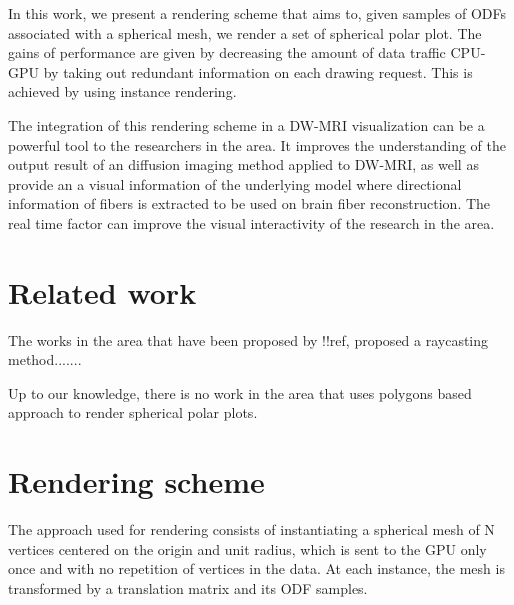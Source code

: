 \documentclass[twoside,twocolumn,10pt]{article}
\begin{document}
In this work, we present a rendering scheme that aims to, given samples of ODFs associated with a spherical mesh, we render a set of spherical polar plot. The gains of performance are given by decreasing the amount of data traffic CPU-GPU by taking out redundant information on each drawing request. This is achieved by using instance rendering.

The integration of this rendering scheme in a DW-MRI visualization can be a powerful tool to the researchers in the area. It improves the understanding of the output result of an diffusion imaging method applied to DW-MRI, as well as provide an a visual information of the underlying model where directional information of fibers is extracted to be used on brain fiber reconstruction. The real time factor can improve the visual interactivity of the research in the area.













\section{Related work}

The works in the area that have been proposed by !!ref, proposed a raycasting method.......

Up to our knowledge, there is no work in the area that uses polygons based approach to render spherical polar plots.


\section{Rendering scheme}

The approach used for rendering consists of instantiating a spherical mesh of N vertices centered on the origin and unit radius, which is sent to the GPU only once and with no repetition of vertices in the data. At each instance, the mesh is transformed by a translation matrix and its ODF samples.
\end{document}
